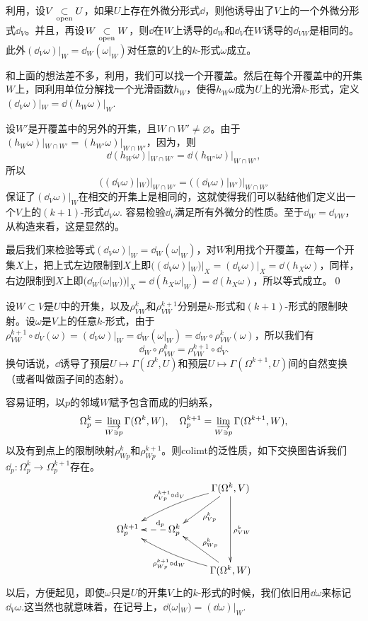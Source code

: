 \pro \label{localdef}利用，设$V\underset{\mathrm{open}}{\subset} U$，如果$U$上存在外微分形式$\dd$，则他诱导出了$V$上的一个外微分形式$\dd_V$。并且，再设$W\underset{\mathrm{open}}{\subset} W$，则$\dd$在$W$上诱导的$\dd_W$和$\dd_V$在$W$诱导的$\dd_{VW}$是相同的。此外$(\dd_V \omega)|_W=\dd_W (\omega|_W)$对任意的$V$上的$k$-形式$\omega$成立。

\proof 和上面的想法差不多，利用，我们可以找一个开覆盖。然后在每个开覆盖中的开集$W$上，同利用单位分解找一个光滑函数$h_W$，使得$h_W\omega$成为$U$上的光滑$k$-形式，定义$(\dd_V \omega)|_{W}=\dd (h_W\omega)|_{W}$.

设$W'$是开覆盖中的另外的开集，且$W\cap W'\neq \varnothing$。由于$(h_W\omega)|_{W\cap W'}=(h_{W'}\omega)|_{W\cap W'}$，因为，则
\[
	\dd (h_W\omega)|_{W\cap W'}=\dd (h_{W'}\omega)|_{W\cap W'},
\]
所以
\[
	((\dd_V \omega)|_{W})|_{W\cap W'}=((\dd_V \omega)|_{W'})|_{W\cap W'}
\]
保证了$(\dd_V \omega)|_W$在相交的开集上是相同的，这就使得我们可以黏结他们定义出一个$V$上的$(k+1)$-形式$\dd_V \omega$. 容易检验$\dd_V$满足所有外微分的性质。至于$\dd_W=\dd_{VW}$，从构造来看，这是显然的。

最后我们来检验等式$(\dd_V \omega)|_W=\dd_W (\omega|_W)$，对$W$利用找个开覆盖，在每一个开集$X$上，把上式左边限制到$X$上即$((\dd_V \omega)|_W)|_X=(\dd_V \omega)|_X=\dd(h_X\omega)$，同样，右边限制到$X$上即$(\dd_W (\omega|_W))|_X=\dd(h_X\omega|_W)=\dd(h_X\omega)$，所以等式成立。\qed

\para 设$W\subset V$是$U$中的开集，以及$\rho^k_{VW}$和$\rho^{k+1}_{VW}$分别是$k$-形式和$(k+1)$-形式的限制映射。设$\omega$是$V$上的任意$k$-形式，由于$\rho^{k+1}_{VW}\circ \dd_V (\omega)=(\dd_V \omega)|_W=\dd_W (\omega|_W)=\dd_W \circ \rho^k_{VW}(\omega)$，所以我们有
\[
\dd_W\circ \rho^k_{VW}=\rho^{k+1}_{VW}\circ \dd_V.
\]
换句话说，$\dd$诱导了预层$U\mapsto \Gamma(\Omega^k,U)$和预层$U\mapsto \Gamma(\Omega^{k+1},U)$间的自然变换（或者叫做函子间的态射）。

\para 容易证明，以$p$的邻域$W$赋予包含而成的归纳系，
\[
	\Omega_p^k=\varinjlim_{W\ni p}\Gamma(\Omega^k,W),\quad \Omega_p^{k+1}=\varinjlim_{W\ni p}\Gamma(\Omega^{k+1},W),
\]
以及有到点上的限制映射$\rho^k_{Wp}$和$\rho^{k+1}_{Wp}$。则colimt的泛性质，如下交换图告诉我们$\dd_p:\Omega_p^k\to \Omega_p^{k+1}$存在。
\[
	\xymatrix{
	&&\ar[dl]^{\rho^k_{Vp}}\Gamma(\Omega^k,V)\ar[dd]^{\rho^k_{VW}}\ar@/_/[lld]_{\rho^{k+1}_{Vp}\circ \dd_V} \\
	\Omega_p^{k+1}&\ar@{-->}[l]_(0.3){\dd_p}\Omega_p^{k}&\\
	&&\ar[ul]_{\rho^k_{Wp}}\Gamma(\Omega^k,W)\ar@/^/[llu]^{\rho^{k+1}_{Wp}\circ \dd_W}
	}
\]
以后，方便起见，即使$\omega$只是$U$的开集$V$上的$k$-形式的时候，我们依旧用$\dd \omega$来标记$\dd_V \omega$.这当然也就意味着，在记号上，$\dd(\omega|_W)=(\dd\omega)|_W$.

